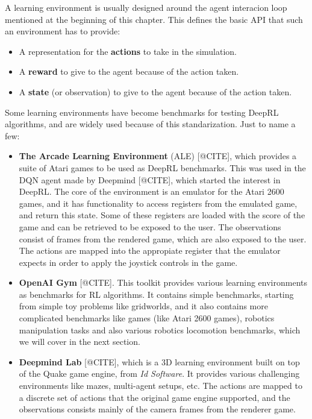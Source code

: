 A learning environment is usually designed around the agent interacion loop mentioned
at the beginning of this chapter. This defines the basic API that such an environment
has to provide:

\begin{itemize}
    \item A representation for the \textbf{actions} to take in the simulation.
    \item A \textbf{reward} to give to the agent because of the action taken.
    \item A \textbf{state} (or observation) to give to the agent because of the action taken.
\end{itemize}

Some learning environments have become benchmarks for testing DeepRL algorithms, and
are widely used because of this standarization. Just to name a few:

\begin{itemize}

    \item \textbf{The Arcade Learning Environment} (ALE) [@CITE], which provides a suite
           of Atari games to be used as DeepRL benchmarks. This was used in the DQN
           agent made by Deepmind [@CITE], which started the interest in DeepRL.
           The core of the environment is an emulator for the Atari 2600 games, and
           it has functionality to access registers from the emulated game, and return
           this state. Some of these registers are loaded with the score of the game
           and can be retrieved to be exposed to the user. The observations consist
           of frames from the rendered game, which are also exposed to the user. The actions
           are mapped into the appropiate register that the emulator expects in order
           to apply the joystick controls in the game.

           \figALEgames

    \item \textbf{OpenAI Gym} [@CITE]. This toolkit provides various learning environments
           as benchmarks for RL algorithms. It contains simple benchmarks, starting from simple
           toy problems like gridworlds, and it also contains more complicated benchmarks like
           games (like Atari 2600 games), robotics manipulation tasks and also various
           robotics locomotion benchmarks, which we will cover in the next section.

           \figOpenAIEnvs

    \item \textbf{Deepmind Lab} [@CITE], which is a 3D learning environment built on top
           of the Quake game engine, from \textit{Id Software}. It provides various challenging
           environments like mazes, multi-agent setups, etc. The actions are mapped to a discrete
           set of actions that the original game engine supported, and the observations consists
           mainly of the camera frames from the renderer game.

           \figDeepmindLabEnvs

\end{itemize}

